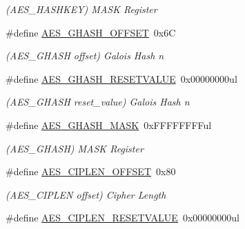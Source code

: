 \begin{DoxyCompactItemize}
\begin{DoxyCompactList}\small\item\em (A\+E\+S\+\_\+\+H\+A\+S\+H\+K\+E\+Y) M\+A\+S\+K Register \end{DoxyCompactList}\item 
\hypertarget{group___s_a_m_l21___a_e_s_gabdc82d19fc90c68e64609ef90ba0346d}{}\#define \hyperlink{group___s_a_m_l21___a_e_s_gabdc82d19fc90c68e64609ef90ba0346d}{A\+E\+S\+\_\+\+G\+H\+A\+S\+H\+\_\+\+O\+F\+F\+S\+E\+T}~0x6\+C\label{group___s_a_m_l21___a_e_s_gabdc82d19fc90c68e64609ef90ba0346d}

\begin{DoxyCompactList}\small\item\em (A\+E\+S\+\_\+\+G\+H\+A\+S\+H offset) Galois Hash n \end{DoxyCompactList}\item 
\hypertarget{group___s_a_m_l21___a_e_s_ga2e6d76c3282e89760281d4f1325c3531}{}\#define \hyperlink{group___s_a_m_l21___a_e_s_ga2e6d76c3282e89760281d4f1325c3531}{A\+E\+S\+\_\+\+G\+H\+A\+S\+H\+\_\+\+R\+E\+S\+E\+T\+V\+A\+L\+U\+E}~0x00000000ul\label{group___s_a_m_l21___a_e_s_ga2e6d76c3282e89760281d4f1325c3531}

\begin{DoxyCompactList}\small\item\em (A\+E\+S\+\_\+\+G\+H\+A\+S\+H reset\+\_\+value) Galois Hash n \end{DoxyCompactList}\item 
\hypertarget{group___s_a_m_l21___a_e_s_ga3d0d670007ecc74cf84ba2442017a466}{}\#define \hyperlink{group___s_a_m_l21___a_e_s_ga3d0d670007ecc74cf84ba2442017a466}{A\+E\+S\+\_\+\+G\+H\+A\+S\+H\+\_\+\+M\+A\+S\+K}~0x\+F\+F\+F\+F\+F\+F\+F\+Ful\label{group___s_a_m_l21___a_e_s_ga3d0d670007ecc74cf84ba2442017a466}

\begin{DoxyCompactList}\small\item\em (A\+E\+S\+\_\+\+G\+H\+A\+S\+H) M\+A\+S\+K Register \end{DoxyCompactList}\item 
\hypertarget{group___s_a_m_l21___a_e_s_ga5f0cafe0945c9251a1f82a2a53639e53}{}\#define \hyperlink{group___s_a_m_l21___a_e_s_ga5f0cafe0945c9251a1f82a2a53639e53}{A\+E\+S\+\_\+\+C\+I\+P\+L\+E\+N\+\_\+\+O\+F\+F\+S\+E\+T}~0x80\label{group___s_a_m_l21___a_e_s_ga5f0cafe0945c9251a1f82a2a53639e53}

\begin{DoxyCompactList}\small\item\em (A\+E\+S\+\_\+\+C\+I\+P\+L\+E\+N offset) Cipher Length \end{DoxyCompactList}\item 
\hypertarget{group___s_a_m_l21___a_e_s_ga2a5bed37ca6f471a82065f70da4e3a2d}{}\#define \hyperlink{group___s_a_m_l21___a_e_s_ga2a5bed37ca6f471a82065f70da4e3a2d}{A\+E\+S\+\_\+\+C\+I\+P\+L\+E\+N\+\_\+\+R\+E\+S\+E\+T\+V\+A\+L\+U\+E}~0x00000000ul\label{group___s_a_m_l21___a_e_s_ga2a5bed37ca6f471a82065f70da4e3a2d}


\end{DoxyCompactItemize}
